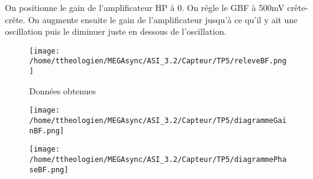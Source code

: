 \documentclass[a4paper,12pt]{article}
\begin{document}
		\par On positionne le gain de l’amplificateur HP à 0.
		On régle le GBF à 500mV crête-crête.
		On augmente ensuite le gain de l’amplificateur jusqu’à ce qu’il y ait une oscillation puis le diminuer juste en dessous de l’oscillation.

		\begin{figure}[!h]
			\caption{Données obtenues}
			\centering
			\texttt{[image: /home/ttheologien/MEGAsync/ASI\_3.2/Capteur/TP5/releveBF.png]}
		\end{figure}

		\begin{figure}[!h]
			\caption{}
			\centering
			\texttt{[image: /home/ttheologien/MEGAsync/ASI\_3.2/Capteur/TP5/diagrammeGainBF.png]}
		\end{figure}

		\begin{figure}[!h]
			\caption{}
			\centering
			\texttt{[image: /home/ttheologien/MEGAsync/ASI\_3.2/Capteur/TP5/diagrammePhaseBF.png]}
		\end{figure}
\end{document}
